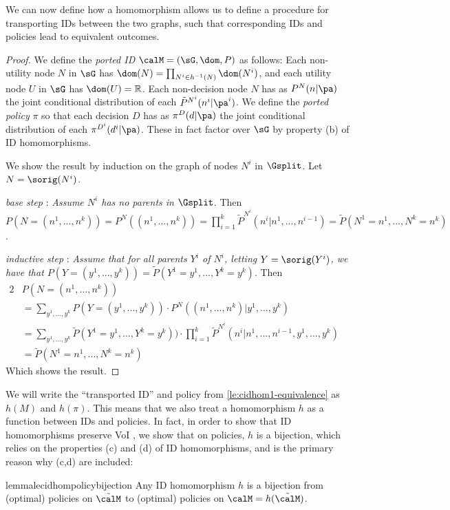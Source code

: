 We can now define how a homomorphism allows us to define a procedure for 
transporting IDs between the two graphs, such that corresponding 
IDs and policies lead to equivalent outcomes.






\lecidhomequivalence*

\begin{proof}
We define the \emph{ported ID} $\calM=(\sG,\dom,P)$ as follows: Each non-utility node $N$ in $\sG$ has $\dom(N) =  \prod_{N^i\in h^{-1}(N)} \dom(N^i)$, and each utility node $U$ in $\sG$ has $\dom (U) = \mathbb R$. Each non-decision node $N$ has as $P^N(n|\pa)$ the joint conditional distribution of each $\tilde P^{N^i}(n^i|\pa^i)$. We define the \emph{ported policy} $\pi$ so that each decision $D$ has as $\pi^D(d|\pa)$ the joint conditional distribution of each $\pi^{D^i}(d^i|\pa)$. These in fact factor over $\sG$  by property (b) of ID homomorphisms.


We show the result by induction on the graph of nodes $N^i$ in $\Gsplit$. Let $N=\sorig(N^i)$. 

\sloppy \textit{base step} : \textit{Assume $N^i$ has no parents in $\Gsplit$}. Then $P(N\!=\!(n^1,...,n^k)) =P^N((n^1,...,n^k))=\prod_{i=1}^k \tilde P^{N^i}(n^i|n^1,...,n^{i-1})
=\tilde P(N^1\!=\!n^1,...,N^k=n^k)$.

\textit{inductive step} : \textit{Assume that for all parents $Y^i$ of $N^i$, letting $Y=\sorig(Y^i)$, we have that $P(Y\!=\!(y^1,...,y^k))=\tilde P(Y^1\!=\!y^1,...,Y^k=y^k)$}. Then
\begin{alignat*}{2}
    &P(N\!=\!(n^1,...,n^k))\\
    &=  \sum_{y^1,...,y^k}P(Y\!=\!(y^1,...,y^k))\cdot P^N((n^1,...,n^k)|y^1,...,y^k)
    \quad\quad &&{}\\
    &=\sum_{y^1,...,y^k}\tilde P(Y^1\!=\!y^1,...,Y^k\!=\!y^k))\cdot \prod_{i=1}^k \tilde P^{N^i}(n^i|n^1,...,n^{i-1}, y^1,...,y^k)
    \quad\quad && \text{}\\
    &=\tilde P(N^1\!=\!n^1,...,N^k=n^k) \quad &&\text{} 
\end{alignat*}
Which shows the result.
\end{proof}

We will write 
the ``transported ID'' and policy from \cref{le:cidhom1-equivalence} as
$h(M)$ and $h(\pi)$. This means that we also treat a homomorphism $h$ as a function between IDs and policies. In fact, in order to show that ID homomorphisms preserve VoI %
, we show that on policies, $h$ is a bijection, which relies on the properties (c) and (d) of ID homomorphisms,  and is the primary reason why (c,d) are included:
\begin{restatable}{lemma}{lecidhompolicybijection} \label{le:bijection-between-deterministic-policies-on-split-graph}
Any ID homomorphism $h$ is a bijection from (optimal) policies on $\tilde \calM$ to (optimal) policies on $\calM=h(\tilde \calM)$. 
\end{restatable}


